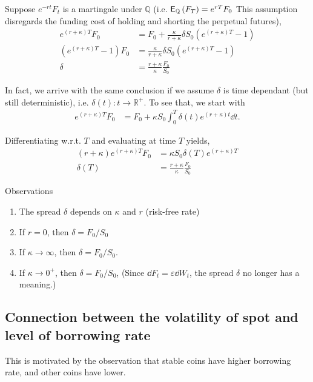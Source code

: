 \documentclass[square]{article} %
\theoremstyle{plain}
\theoremstyle{definition} %
\begin{document}
Suppose $e^{-rt} F_t$ is a martingale under $\mathbb{Q}$ (i.e. $\mathbb{\sf E}_\mathbb{Q} \left(F_T\right)= e^{rT}F_0$ {\color{red} This assumption disregards the funding cost of holding and shorting the perpetual futures}), 
\begin{align*}
e^{(r+\kappa)T}F_0 &= F_0 +  \frac{\kappa}{r+\kappa} \delta S_0 \left(e^{(r+\kappa) T} - 1\right)\\
\left(e^{(r+\kappa)T}-1\right)F_0 &=  \frac{\kappa}{r+\kappa}\delta S_0 \left(e^{(r+\kappa) T} - 1\right)\\
\delta &= \frac{r+\kappa}{\kappa}\frac{F_0}{S_0}
\end{align*}

In fact, we arrive with the same conclusion if we assume $\delta$ is time dependant (but still deterministic), i.e. $\delta(t): t \rightarrow \mathbb{R}^+$.
 To see that, we start with 
 \begin{align*}
  e^{(r+\kappa) T} F_0 &= F_0 +  \kappa  S_0 \int_0^T \delta(t) e^{(r+\kappa) t}\dd t.
\end{align*}

Differentiating w.r.t. $T$ and evaluating at time $T$ yields,
\begin{align*}
  (r+\kappa) e^{(r+\kappa) T} F_0 &= \kappa S_0 \delta(T) e^{(r+\kappa) T}\\
  \delta(T) &= \frac{r+\kappa}{\kappa}\frac{F_0}{S_0}
\end{align*}

Observations
\begin{enumerate}
\item The spread $\delta $ depends on $\kappa$ and $r$ (risk-free rate)
\item If $r=0$, then $\delta  = F_0/S_0$
\item If $\kappa \rightarrow \infty$, then $\delta  = F_0/S_0$.
\item If $\kappa \rightarrow 0^+$, then $\delta  = F_0/S_0$, (Since $\dd F_t = \varepsilon \dd W_t$, the spread $\delta$ no longer has a meaning.)
\end{enumerate}


\subsection{Connection between the volatility of spot and level of borrowing rate}
This is motivated by the observation that stable coins have higher borrowing rate, and other coins have lower. \\
\end{document}
